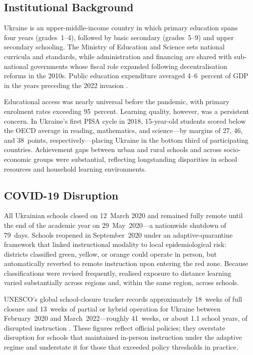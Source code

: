 
\subsection{Institutional Background}
\label{subsec:institutional}

Ukraine is an upper-middle-income country in which primary education spans four years
(grades~1--4), followed by basic secondary (grades~5--9) and upper secondary schooling.
The Ministry of Education and Science sets national curricula and standards, while
administration and financing are shared with sub-national governments whose fiscal
role expanded following decentralisation reforms in the 2010s. Public education
expenditure averaged 4--6~percent of GDP in the years preceding the 2022 invasion
\citep{unesco2022ukraine}.

Educational access was nearly universal before the pandemic, with primary enrolment
rates exceeding 95~percent. Learning quality, however, was a persistent concern.
In Ukraine's first PISA cycle in 2018, 15-year-old students scored below the OECD
average in reading, mathematics, and science---by margins of 27, 46, and 38~points,
respectively---placing Ukraine in the bottom third of participating countries.
Achievement gaps between urban and rural schools and across socio-economic groups
were substantial, reflecting longstanding disparities in school resources and
household learning environments.

\subsection{COVID-19 Disruption}
\label{subsec:covid}

All Ukrainian schools closed on 12~March 2020 and remained fully remote until the
end of the academic year on 29~May~2020---a nationwide shutdown of 79~days. Schools
reopened in September~2020 under an adaptive-quarantine framework that linked
instructional modality to local epidemiological risk: districts classified green,
yellow, or orange could operate in person, but automatically reverted to remote
instruction upon entering the red zone. Because classifications were revised
frequently, realised exposure to distance learning varied substantially across
regions and, within the same region, across schools.

UNESCO's global school-closure tracker records approximately 18~weeks of full closure
and 13~weeks of partial or hybrid operation for Ukraine between February~2020 and
March~2022---roughly 41~weeks, or about 1.1 school years, of disrupted instruction
\citep{unesco2025closures}. These figures reflect official policies; they overstate
disruption for schools that maintained in-person instruction under the adaptive
regime and understate it for those that exceeded policy thresholds in practice.

